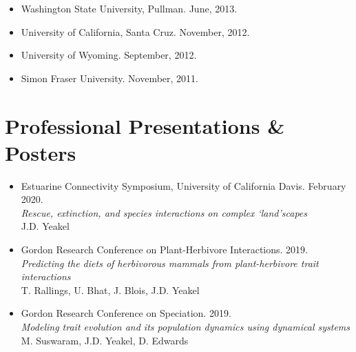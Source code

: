 \documentclass[margin,line,12pt]{res}
\begin{document}
\begin{resume}
\begin{itemize}
\item Washington State University, Pullman. June, 2013.

\item University of California, Santa Cruz. November, 2012.

\item University of Wyoming. September, 2012.

\item Simon Fraser University. November, 2011.
\end{itemize}

\section{\sc Professional Presentations \& Posters}
\begin{itemize}

\item Estuarine Connectivity Symposium, University of California Davis. February 2020.\\
\emph{Rescue, extinction, and species interactions on complex `land'scapes}\\
J.D. Yeakel

\item Gordon Research Conference on Plant-Herbivore Interactions. 2019.\\
\emph{Predicting the diets of herbivorous mammals from plant-herbivore trait interactions}\\
T. Rallings, U. Bhat, J. Blois, J.D. Yeakel

\item Gordon Research Conference on Speciation. 2019.\\
\emph{Modeling trait evolution and its population dynamics using dynamical systems}\\
M. Suswaram, J.D. Yeakel, D. Edwards


\end{itemize}
\end{resume}
\end{document}
